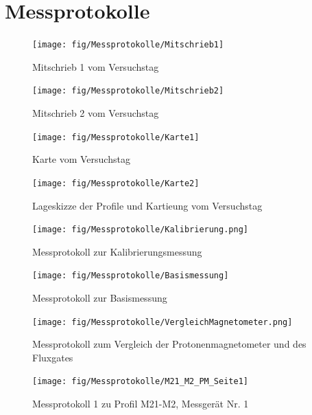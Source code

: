 \section{Messprotokolle}


\begin{figure}[!ht]
 \centering
 \texttt{[image: fig/Messprotokolle/Mitschrieb1]}
 \caption{Mitschrieb 1 vom Versuchstag}
 \label{fig:Mitschrieb_erstes}
\end{figure}

\begin{figure}[!ht]
 \centering
 \texttt{[image: fig/Messprotokolle/Mitschrieb2]}
 \caption{Mitschrieb 2 vom Versuchstag}
\end{figure}

\begin{figure}[!ht]
 \centering
 \texttt{[image: fig/Messprotokolle/Karte1]}
 \caption{Karte vom Versuchstag}
\end{figure}

\begin{figure}[!ht]
 \centering
 \texttt{[image: fig/Messprotokolle/Karte2]}
 \caption{Lageskizze der Profile und Kartieung vom Versuchstag}
 \label{fig:Mitschrieb_letztes}
\end{figure}

\begin{figure}[!ht]
 \centering
 \texttt{[image: fig/Messprotokolle/Kalibrierung.png]}
 \caption{Messprotokoll zur Kalibrierungsmessung}
 \label{fig:MPKalibrierung}
\end{figure}


\begin{figure}[!ht]
 \centering
 \texttt{[image: fig/Messprotokolle/Basismessung]}
 \caption{Messprotokoll zur Basismessung}
 \label{fig:MPBasis}
\end{figure}


\begin{figure}[!ht]
 \centering
 \texttt{[image: fig/Messprotokolle/VergleichMagnetometer.png]}
 \caption{Messprotokoll zum Vergleich der Protonenmagnetometer und des Fluxgates}
 \label{fig:MPVergleich}
\end{figure}



\begin{figure}[!ht]
 \centering
 \texttt{[image: fig/Messprotokolle/M21\_M2\_PM\_Seite1]}
 \caption{Messprotokoll 1 zu Profil M21-M2, Messgerät Nr. 1}
 \label{fig:MPProfil_erstes}
\end{figure}

